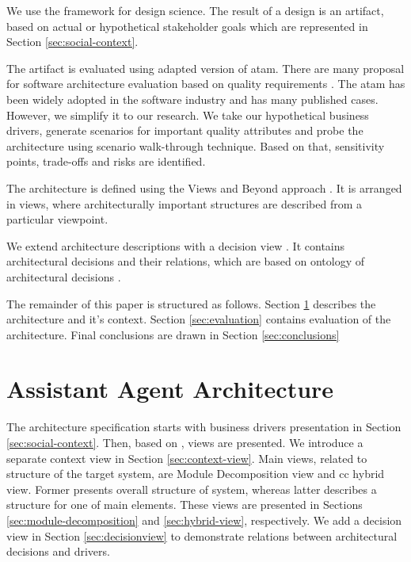 \documentclass{llncs}
\begin{document}
We  use the framework \cite{wieringa2014design} for design science. The result of a design is an artifact, based on actual or hypothetical stakeholder goals which are represented in Section \ref{sec:social-context}. 

The artifact is evaluated using adapted version of \gls{atam}. There are many proposal for software architecture evaluation based on quality requirements \cite{babar2004comparison}. The \gls{atam} \cite{kazman2000} has been widely adopted in the software industry and has many published cases. However, we simplify it to our research. We take our hypothetical business drivers, generate scenarios for important quality attributes and probe the architecture using scenario walk-through technique. Based on that, sensitivity points, trade-offs and risks are identified. %

The architecture is defined using the Views and Beyond approach \cite{bachmann2010documenting}. It is arranged in views, where architecturally important structures are described from a particular viewpoint.

We extend architecture descriptions with a decision view \cite{kruchten2009decision}. It contains architectural decisions and their relations, which are based on ontology of architectural decisions \cite{kruchten2004Ontology}.

The remainder of this paper is structured as follows. Section \ref{sec:architecture} describes the architecture and it's context. Section \ref{sec:evaluation} contains evaluation of the architecture. Final conclusions are drawn in Section \ref{sec:conclusions}


\section{Assistant Agent Architecture}
\label{sec:architecture}
The architecture specification starts with business drivers presentation in Section \ref{sec:social-context}. Then, based on \cite{bachmann2010documenting}, views are presented. We introduce a separate context view in Section \ref{sec:context-view}. Main views, related to structure of the target system, are Module Decomposition view and \gls{cc} hybrid view. Former presents overall structure of system, whereas latter describes a structure for one of main elements. These views are presented in Sections \ref{sec:module-decomposition} and \ref{sec:hybrid-view}, respectively. We add a decision view in Section \ref{sec:decisionview} to demonstrate relations between architectural decisions and drivers.
 
\end{document}
